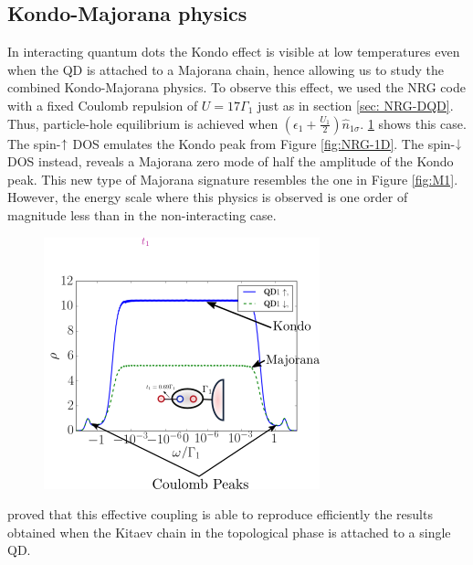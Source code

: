 \subsection{Kondo-Majorana physics}

In interacting quantum dots the Kondo effect is visible at low temperatures even when the QD is attached to a Majorana chain, hence allowing us to study the combined Kondo-Majorana physics. To observe this effect, we used the NRG code with a fixed Coulomb repulsion of $U = 17\Gamma_1$ just as in section \ref{sec: NRG-DQD}. Thus, particle-hole equilibrium is achieved when $\left(\epsilon_{1}+\frac{U_1}{2}\right)\hat{n}_{1\sigma}$.  \ref{fig:NRG-1M} shows this case. The spin-$\uparrow$ DOS emulates the Kondo peak from Figure \ref{fig:NRG-1D}. The spin-$\downarrow$ DOS instead, reveals a Majorana zero mode of half the amplitude of the Kondo peak. This new type of Majorana signature resembles the one in Figure \ref{fig:M1}. However, the energy scale where this physics is observed is one order of magnitude less than in the non-interacting case. 

\begin{figure}[H]
\centering
\includegraphics[scale=0.7]{IMAGES/Majorana/NRG.png}

\caption{  \label{fig:NRG-1M} \protect{}}
\end{figure}


 \citeauthor{ruiz-tijerina_interaction_2015}  proved that this effective coupling  is able to reproduce efficiently the results obtained when the Kitaev chain in the topological phase is attached to a single QD. 

